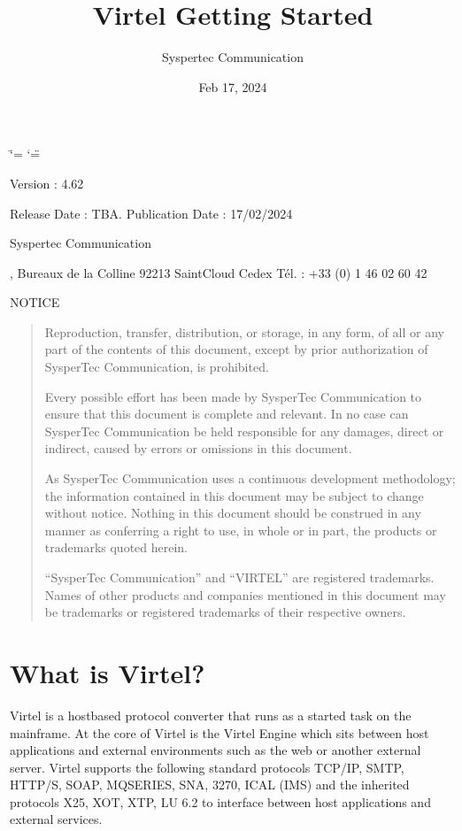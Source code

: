 \documentclass[letterpaper,10pt,english]{sphinxmanual}
\title{Virtel Getting Started}
\date{Feb 17, 2024}
\author{Syspertec Communication}
\begin{document}
\ifdefined\shorthandoff
  \ifnum\catcode`\=\string=\active\shorthandoff{=}\fi
  \ifnum\catcode`\"=\active{}\fi
\fi

\pagestyle{empty}
\sphinxmaketitle
\pagestyle{plain}
\sphinxtableofcontents
\pagestyle{normal}
\label{\detokenize{Getting_Started::doc}}


\sphinxAtStartPar
{}

\sphinxAtStartPar
Version : 4.62

\sphinxAtStartPar
Release Date : TBA. Publication Date : 17/02/2024

\sphinxAtStartPar
Syspertec Communication

, Bureaux de la Colline 92213 Saint\sphinxhyphen{}Cloud Cedex Tél. : +33 (0) 1 46 02 60 42

\sphinxAtStartPar
{}

\sphinxAtStartPar
NOTICE
\begin{quote}

\sphinxAtStartPar
Reproduction, transfer, distribution, or storage, in any form, of all or any part of
the contents of this document, except by prior authorization of SysperTec
Communication, is prohibited.

\sphinxAtStartPar
Every possible effort has been made by SysperTec Communication to ensure that this document
is complete and relevant. In no case can SysperTec Communication be held responsible for
any damages, direct or indirect, caused by errors or omissions in this document.

\sphinxAtStartPar
As SysperTec Communication uses a continuous development methodology; the information
contained in this document may be subject to change without notice. Nothing in this
document should be construed in any manner as conferring a right to use, in whole or in
part, the products or trademarks quoted herein.

\sphinxAtStartPar
“SysperTec Communication” and “VIRTEL” are registered trademarks. Names of other products
and companies mentioned in this document may be trademarks or registered trademarks of
their respective owners.
\end{quote}


\chapter{What is Virtel?}
\label{\detokenize{Getting_Started:what-is-virtel}}
\sphinxAtStartPar
Virtel is a host\sphinxhyphen{}based protocol converter that runs as a started task on the mainframe. At the core of Virtel is the Virtel Engine which sits between host applications and external environments such as the web or another external server. Virtel supports the following standard protocols \sphinxhyphen{} TCP/IP, SMTP, HTTP/S, SOAP, MQ\sphinxhyphen{}SERIES, SNA, 3270, ICAL (IMS) and the inherited protocols \sphinxhyphen{} X25, XOT, XTP, LU 6.2 to interface between host applications and external services.
\end{document}
